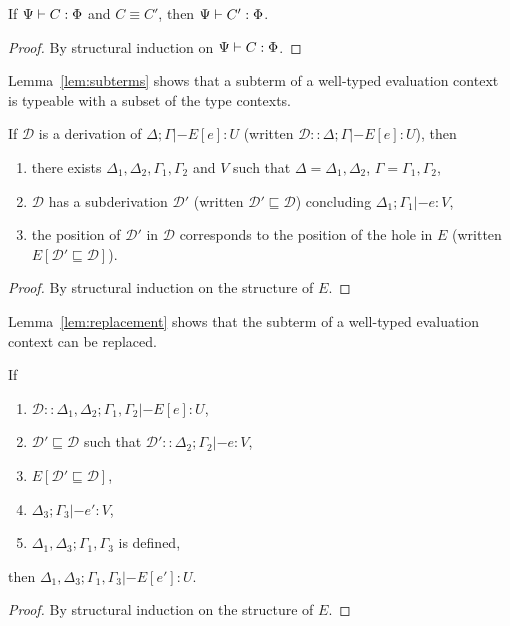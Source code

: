\begin{lemma}\label{lem:equiv}
  If $\Psi |- C : \Phi$ and $C \equiv C'$, then $\Psi |- C' : \Phi$.
  \begin{proof}
    By structural induction on $\Psi |- C : \Phi$.
  \end{proof}
\end{lemma}

Lemma~\ref{lem:subterms} shows that a subterm of a well-typed evaluation context
is typeable with a subset of the type contexts. 

\begin{lemma}\label{lem:subterms}
  If $\mathcal{D}$ is a derivation of $\Delta; \Gamma |- E[e] : U$ (written $\mathcal{D}
  :: \Delta;\Gamma |- E[e] : U$), then
  \begin{enumerate}
    \item there exists $\Delta_1, \Delta_2, \Gamma_1,\Gamma_2$ and $V$ such that $\Delta = \Delta_1,\Delta_2$, $\Gamma =
      \Gamma_1,\Gamma_2$,
    \item $\mathcal{D}$ has a subderivation $\mathcal{D}'$ (written
      $\mathcal{D}' \sqsubseteq \mathcal{D}$) concluding $\Delta_1;\Gamma_1 |- e : V$,
    \item the position of $\mathcal{D}'$ in $\mathcal{D}$ corresponds to the
      position of the hole in $E$ (written $E[\mathcal{D}' \sqsubseteq \mathcal{D}]$).
  \end{enumerate}
  \begin{proof}
    By structural induction on the structure of $E$.
  \end{proof}
\end{lemma}

Lemma~\ref{lem:replacement} shows that the subterm of a well-typed evaluation
context can be replaced.

\begin{lemma}\label{lem:replacement}
  If
  \begin{enumerate}
  \item $\mathcal{D} :: \Delta_1,\Delta_2;\Gamma_1,\Gamma_2 |- E[e] : U$,
  \item $\mathcal{D}' \sqsubseteq \mathcal{D}$ such that $\mathcal{D}' :: \Delta_2; \Gamma_2 |- e : V$,
  \item $E[\mathcal{D}' \sqsubseteq \mathcal{D}]$,
  \item $\Delta_3;\Gamma_3 |- e' : V$,
  \item $\Delta_1,\Delta_3;\Gamma_1,\Gamma_3$ is defined,
  \end{enumerate}
  then $\Delta_1,\Delta_3;\Gamma_1,\Gamma_3 |- E[e'] : U$.
  \begin{proof}
    By structural induction on the structure of $E$.
  \end{proof}  
\end{lemma}

